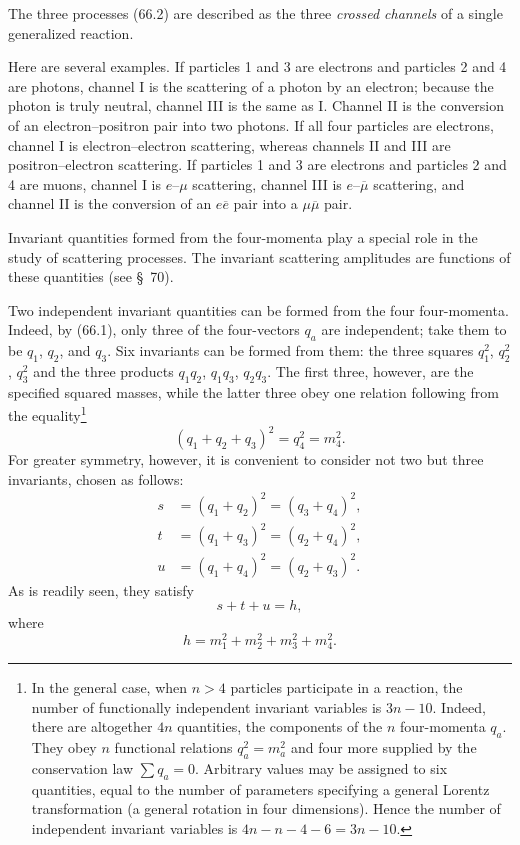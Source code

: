 The three processes (66.2) are described as the three \emph{crossed channels} of a single generalized reaction.

Here are several examples. If particles 1 and 3 are electrons and particles 2 and 4 are photons, channel I is the scattering of a photon by an electron; because the photon is truly neutral, channel III is the same as I. Channel II is the conversion of an electron--positron pair into two photons. If all four particles are electrons, channel I is electron--electron scattering, whereas channels II and III are positron--electron scattering. If particles 1 and 3 are electrons and particles 2 and 4 are muons, channel I is $e$--$\mu$ scattering, channel III is $e$--$\overline\mu$ scattering, and channel II is the conversion of an $e\overline e$ pair into a $\mu\overline\mu$ pair.

Invariant quantities formed from the four-momenta play a special role in the study of scattering processes. The invariant scattering amplitudes are functions of these quantities (see \S~70).

Two independent invariant quantities can be formed from the four four-momenta. Indeed, by (66.1), only three of the four-vectors $q_a$ are independent; take them to be $q_1$, $q_2$, and $q_3$. Six invariants can be formed from them: the three squares $q_1^2$, $q_2^2$, $q_3^2$ and the three products $q_1q_2$, $q_1q_3$, $q_2q_3$. The first three, however, are the specified squared masses, while the latter three obey one relation following from the equality\footnote{In the general case, when $n>4$ particles participate in a reaction, the number of functionally independent invariant variables is $3n-10$. Indeed, there are altogether $4n$ quantities, the components of the $n$ four-momenta $q_a$. They obey $n$ functional relations $q_a^2=m_a^2$ and four more supplied by the conservation law $\sum q_a=0$. Arbitrary values may be assigned to six quantities, equal to the number of parameters specifying a general Lorentz transformation (a general rotation in four dimensions). Hence the number of independent invariant variables is $4n-n-4-6=3n-10$.}
\[
(q_1+q_2+q_3)^2=q_4^2=m_4^2.
\]
For greater symmetry, however, it is convenient to consider not two but three invariants, chosen as follows:
\begin{equation}
\begin{aligned}
s&=(q_1+q_2)^2=(q_3+q_4)^2,\\
t&=(q_1+q_3)^2=(q_2+q_4)^2,\\
u&=(q_1+q_4)^2=(q_2+q_3)^2.
\end{aligned}
\tag{66.3}
\end{equation}
As is readily seen, they satisfy
\begin{equation}
s+t+u=h,
\tag{66.4}
\end{equation}
where
\begin{equation}
h=m_1^2+m_2^2+m_3^2+m_4^2.
\tag{66.5}
\end{equation}

